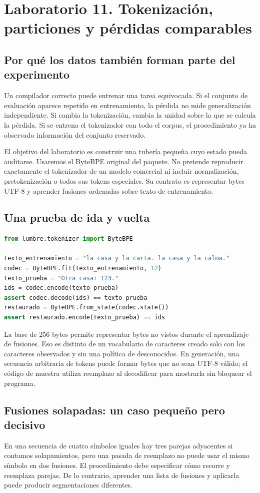 \documentclass[12pt,a4paper,oneside]{report}
\begin{document}
\chapter{Laboratorio 11. Tokenización, particiones y pérdidas comparables}
\label{lab:once}
\section{Por qué los datos también forman parte del experimento}
Un compilador correcto puede entrenar una tarea equivocada. Si el conjunto de evaluación aparece repetido en entrenamiento, la pérdida no mide generalización independiente. Si cambia la tokenización, cambia la unidad sobre la que se calcula la pérdida. Si se entrena el tokenizador con todo el corpus, el procedimiento ya ha observado información del conjunto reservado.

El objetivo del laboratorio es construir una tubería pequeña cuyo estado pueda auditarse. Usaremos el ByteBPE original del paquete. No pretende reproducir exactamente el tokenizador de un modelo comercial ni incluir normalización, pretokenización o todos sus tokens especiales. Su contrato es representar bytes UTF-8 y aprender fusiones ordenadas sobre texto de entrenamiento.

\section{Una prueba de ida y vuelta}
\begin{lstlisting}[language=Python]
from lumbre.tokenizer import ByteBPE

texto_entrenamiento = "la casa y la carta. la casa y la calma."
codec = ByteBPE.fit(texto_entrenamiento, 12)
texto_prueba = "Otra casa: 123."
ids = codec.encode(texto_prueba)
assert codec.decode(ids) == texto_prueba
restaurado = ByteBPE.from_state(codec.state())
assert restaurado.encode(texto_prueba) == ids
\end{lstlisting}
La base de 256 bytes permite representar bytes no vistos durante el aprendizaje de fusiones. Eso es distinto de un vocabulario de caracteres creado solo con los caracteres observados y sin una política de desconocidos. En generación, una secuencia arbitraria de tokens puede formar bytes que no sean UTF-8 válido; el código de muestra utiliza reemplazo al decodificar para mostrarla sin bloquear el programa.

\section{Fusiones solapadas: un caso pequeño pero decisivo}
En una secuencia de cuatro símbolos iguales hay tres parejas adyacentes si contamos solapamientos, pero una pasada de reemplazo no puede usar el mismo símbolo en dos fusiones. El procedimiento debe especificar cómo recorre y reemplaza parejas. De lo contrario, aprender una lista de fusiones y aplicarla puede producir segmentaciones diferentes.
\end{document}
